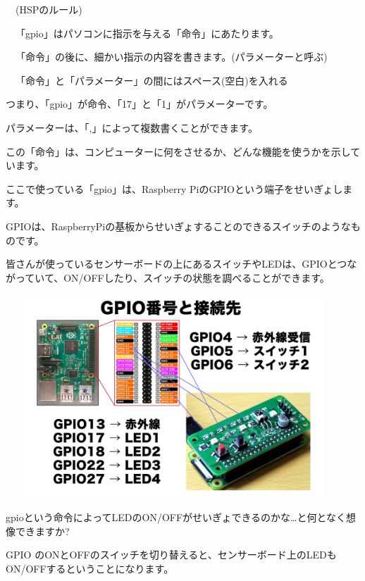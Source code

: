 \documentclass[a4paper,12pt]{jarticle}
\begin{document}
\ \ (HSPのルール)


\bigskip

\ \ 「gpio」はパソコンに指示を与える「命令」にあたります。

\ \ 「命令」の後に、細かい指示の内容を書きます。(パラメーターと呼ぶ)

\ \ 「命令」と「パラメーター」の間にはスペース(空白)を入れる


\bigskip

つまり、「gpio」が命令、「17」と「1」がパラメーターです。

パラメーターは、「,」によって複数書くことができます。

この「命令」は、コンピューターに何をさせるか、どんな機能を使うかを示しています。

ここで使っている「gpio」は、Raspberry PiのGPIOという端子をせいぎょします。


\bigskip

GPIOは、RaspberryPiの基板からせいぎょすることのできるスイッチのようなものです。

皆さんが使っているセンサーボードの上にあるスイッチやLEDは、GPIOとつながっていて、ON/OFFしたり、スイッチの状態を調べることができます。


\bigskip
\bigskip

\begin{minipage}{9.781cm}
\centering
{\upshape
\includegraphics[keepaspectratio,width=12.409cm,height=7.62cm]{text02-img/text02-img025.png}}
\end{minipage}

\bigskip
\bigskip
\bigskip

gpioという命令によってLEDのON/OFFがせいぎょできるのかな…と何となく想像できますか?

GPIO
のONとOFFのスイッチを切り替えると、センサーボード上のLEDもON/OFFするということになります。
\end{document}
